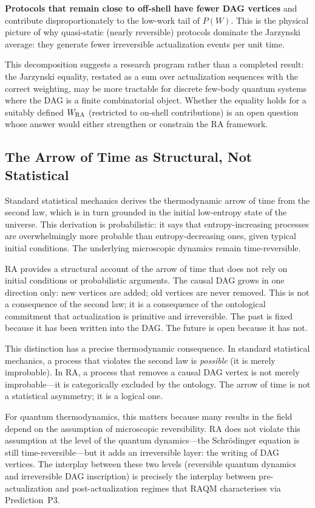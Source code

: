 \documentclass[11pt,a4paper]{article}
\theoremstyle{plain}
\theoremstyle{definition}
\theoremstyle{remark}
\begin{document}
\textbf{Protocols that remain close to off-shell have fewer DAG vertices} and
contribute disproportionately to the low-work tail of $P(W)$. This is the physical
picture of why quasi-static (nearly reversible) protocols dominate the Jarzynski
average: they generate fewer irreversible actualization events per unit time.

This decomposition suggests a research program rather than a completed result: the
Jarzynski equality, restated as a sum over actualization sequences with the correct
weighting, may be more tractable for discrete few-body quantum systems where the
DAG is a finite combinatorial object. Whether the equality holds for a
suitably defined $W_{\rm RA}$ (restricted to on-shell contributions) is an open
question whose answer would either strengthen or constrain the RA framework.

\subsection{The Arrow of Time as Structural, Not Statistical}

Standard statistical mechanics derives the thermodynamic arrow of time from the
second law, which is in turn grounded in the initial low-entropy state of the
universe. This derivation is probabilistic: it says that entropy-increasing
processes are overwhelmingly more probable than entropy-decreasing ones, given
typical initial conditions. The underlying microscopic dynamics remain
time-reversible.

RA provides a structural account of the arrow of time that does not rely on
initial conditions or probabilistic arguments. The causal DAG grows in one
direction only: new vertices are added; old vertices are never removed. This is
not a consequence of the second law; it is a consequence of the ontological
commitment that actualization is primitive and irreversible. The past is fixed
because it has been written into the DAG. The future is open because it has not.

This distinction has a precise thermodynamic consequence. In standard statistical
mechanics, a process that violates the second law is \emph{possible} (it is merely
improbable). In RA, a process that removes a causal DAG vertex is not merely
improbable---it is categorically excluded by the ontology. The arrow of time is not
a statistical asymmetry; it is a logical one.

For quantum thermodynamics, this matters because many results in the field depend
on the assumption of microscopic reversibility. RA does not violate this
assumption at the level of the quantum dynamics---the Schr\"{o}dinger equation is
still time-reversible---but it adds an irreversible layer: the writing of DAG
vertices. The interplay between these two levels (reversible quantum dynamics and
irreversible DAG inscription) is precisely the interplay between pre-actualization
and post-actualization regimes that RAQM characterises via Prediction~P3.
\end{document}

